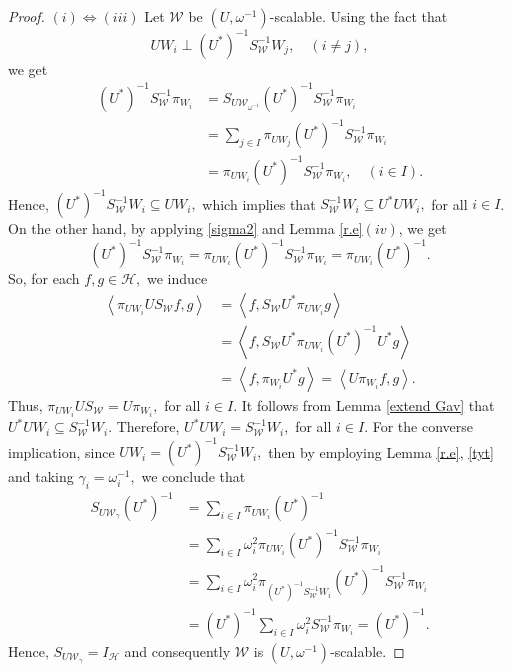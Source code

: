 \documentclass[10pt,a4paper]{amsart}
\begin{document}
\begin{proof}
$(i)\Leftrightarrow (iii)$ Let $\mathcal{W}$ be $\left( U,\omega^{-1}\right) $-scalable. Using the fact that
\begin{equation}\label{tyt}
UW_{i}\perp \left( U^*\right) ^{-1}S_{\mathcal{W}}^{-1}W_{j},\quad (i\neq j),
\end{equation}
we get
\begin{equation}\label{sigma2}
\begin{aligned}
\left( U^*\right) ^{-1}S_{\mathcal{W}}^{-1}\pi_{W_{i}}&=S_{U\mathcal{W}_{\omega^{-1}}}\left( U^*\right) ^{-1}S_{\mathcal{W}}^{-1}\pi_{W_{i}}
\\&=\sum_{j \in I}\pi_{UW_{j}}\left( U^*\right) ^{-1}S_{\mathcal{W}}^{-1}\pi_{W_{i}}
\\&=\pi_{UW_{i}}\left( U^*\right) ^{-1}S_{\mathcal{W}}^{-1}\pi_{W_{i}}, \quad (i \in I).
\end{aligned}
\end{equation}
Hence, $ \left( U^*\right) ^{-1}S_{\mathcal{W}}^{-1}W_{i}\subseteq UW_{i} ,$ which implies that $S_{\mathcal{W}}^{-1}W_{i}\subseteq U^*UW_{i},$ for all $i \in I$.
On the other hand, by applying \eqref{sigma2} and Lemma \ref{r.e}$(iv)$, we get
\begin{equation*}
\left( U^*\right) ^{-1}S_{\mathcal{W}}^{-1}\pi_{W_{i}}=\pi_{UW_{i}}\left( U^*\right) ^{-1}S_{\mathcal{W}}^{-1}\pi_{W_{i}}=\pi_{UW_{i}}\left( U^*\right) ^{-1}.
\end{equation*}
So, for each $f,g \in \mathcal {H},$ we induce
\begin{align*}
\left\langle  \pi_{UW_{i}}US_{\mathcal{W}}f,g \right\rangle  &= \left\langle f , S_{\mathcal{W}}U^{*}\pi_{UW_{i}}g \right\rangle 
\\&= \left\langle f , S_{\mathcal{W}}U^{*}\pi_{UW_{i}}\left( U^*\right) ^{-1}U^*g \right\rangle 
\\&= \left\langle f , \pi_{W_{i}}U^*g \right\rangle  = \left\langle  U\pi_{W_{i}}f,g \right\rangle.
\end{align*}
Thus, $\pi_{UW_{i}}US_{\mathcal{W}}=U\pi_{W_{i}},$ for all $i \in I.$ It follows from Lemma \ref{extend Gav} that $U^*UW_{i}\subseteq S_{\mathcal{W}}^{-1}W_{i}.$ Therefore, $U^*UW_{i}=S_{\mathcal{W}}^{-1}W_{i},$ for all $i \in I$. For the converse implication, since $UW_{i}=\left( U^*\right) ^{-1}S_{\mathcal{W}}^{-1}W_{i},$ then by employing Lemma \ref{r.e}, \eqref{tyt} and taking $ \gamma_{i}=\omega_{i}^{-1},$ we conclude that
\begin{align*}
S_{U\mathcal{W}_{\gamma}}\left( U^*\right) ^{-1}&=\sum_{i \in I}\pi_{UW_{i}}\left( U^*\right) ^{-1}
\\&=\sum_{i \in I}\omega_{i}^{2}\pi_{UW_{i}}\left( U^*\right) ^{-1}S_{\mathcal{W}}^{-1}\pi_{W_{i}}
\\&=\sum_{i \in I}\omega_{i}^{2}\pi_{\left( U^*\right) ^{-1}S_{\mathcal{W}}^{-1}W_{i}}\left( U^*\right) ^{-1}S_{\mathcal{W}}^{-1}\pi_{W_{i}}
\\&=\left( U^*\right) ^{-1}\sum_{i \in I}\omega_{i}^{2}S_{\mathcal{W}}^{-1}\pi_{W_{i}}=\left( U^*\right) ^{-1}.
\end{align*}
Hence, $S_{U\mathcal{W}_{\gamma}}=I_{\mathcal {H}}$ and consequently $\mathcal{W}$ is $\left( U,\omega^{-1}\right) $-scalable.


\end{proof}
\end{document}
